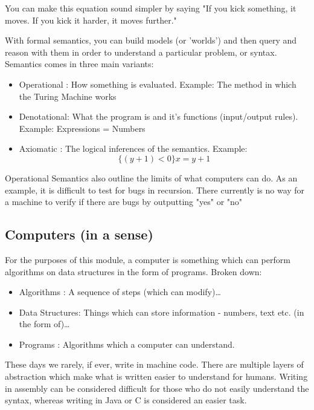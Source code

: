\documentclass[12pt]{article}
\begin{document}
You can make this equation sound simpler by saying "If you kick something, it
moves.  If you kick it harder, it moves further."

With formal semantics, you can build models (or 'worlds') and then query and
reason with them in order to understand a particular problem, or syntax.
Semantics comes in three main variants:

\begin{itemize}
  \item Operational : How something is evaluated.
                    Example: The method in which the Turing Machine works
  \item Denotational: What the program is and it's functions (input/output 
                    rules).
                    Example: Expressions = Numbers
  \item Axiomatic   : The logical inferences of the semantics.
                    Example: $$\{ (y + 1) < 0\} x = y + 1$$
\end{itemize}

Operational Semantics also outline the limits of what computers can do.  As an
example, it is difficult to test for bugs in recursion.  There currently is no
way for a machine to verify if there are bugs by outputting "yes" or "no"

\subsection{Computers (in a sense)}
\label{sec-1-4}
For the purposes of this module, a computer is something which can perform
algorithms on data structures in the form of programs.  Broken down:

\begin{itemize}
  \item Algorithms     : A sequence of steps (which can modify)\ldots{}
  \item Data Structures: Things which can store information - numbers, text etc.
                         (in the form of)\ldots{}
  \item Programs       : Algorithms which a computer can understand.
\end{itemize}

These days we rarely, if ever, write in machine code.  There are multiple
layers of abstraction which make what is written easier to understand for
humans.  Writing in assembly can be considered difficult for those who do not
easily understand the syntax, whereas writing in Java or C is considered an
easier task.
\end{document}
